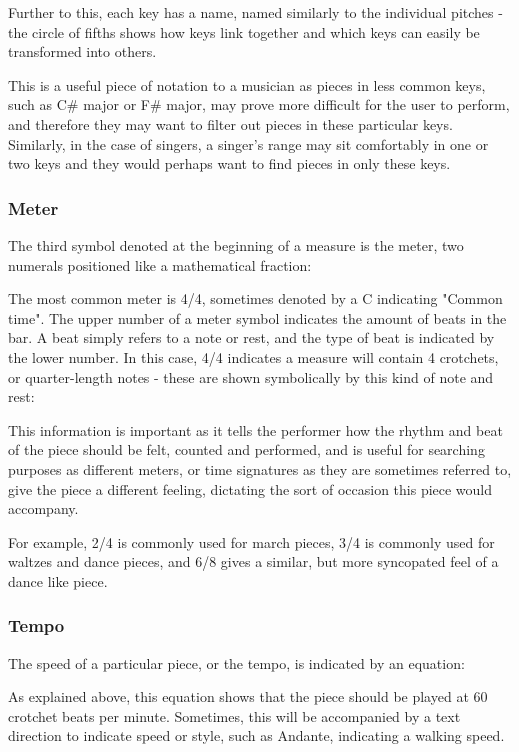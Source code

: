 Further to this, each key has a name, named similarly to the individual pitches - the circle of fifths shows how keys link together and which keys can easily be transformed into others. \parencite{cofitfths}

This is a useful piece of notation to a musician as pieces in less common keys, such as C\# major or F\# major, may prove more difficult for the user to perform, and therefore they may want to filter out pieces in these particular keys. Similarly, in the case of singers, a singer's range may sit comfortably in one or two keys and they would perhaps want to find pieces in only these keys. 

\subsubsection{Meter}
The third symbol denoted at the beginning of a measure is the meter, two numerals positioned like a mathematical fraction:

The most common meter is 4/4, sometimes denoted by a C indicating "Common time". The upper number of a meter symbol indicates the amount of beats in the bar. A beat simply refers to a note or rest, and the type of beat is indicated by the lower number. In this case, 4/4 indicates a measure will contain 4 crotchets, or quarter-length notes - these are shown symbolically by this kind of note and rest:

This information is important as it tells the performer how the rhythm and beat of the piece should be felt, counted and performed, and is useful for searching purposes as different meters, or time signatures as they are sometimes referred to, give the piece a different feeling, dictating the sort of occasion this piece would accompany. 

For example, 2/4 is commonly used for march pieces, 3/4 is commonly used for waltzes and dance pieces, and 6/8 gives a similar, but more syncopated feel of a dance like piece.

\subsubsection{Tempo}
The speed of a particular piece, or the tempo, is indicated by an equation:

As explained above, this equation shows that the piece should be played at 60 crotchet beats per minute. Sometimes, this will be accompanied by a text direction to indicate speed or style, such as Andante, indicating a walking speed.

